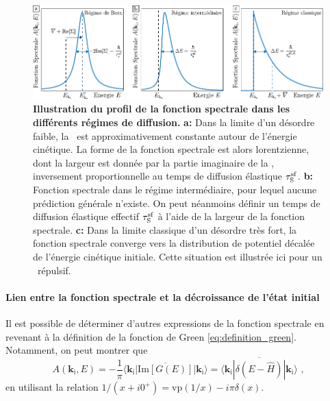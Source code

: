 \begin{figure}
\centering
\includegraphics[width=\textwidth]{Fig/TauS_NJP/illustration_fonction_spectrale_diffusion.pdf}
\caption{\textbf{Illustration du profil de la fonction spectrale dans les différents régimes de diffusion.} \textbf{a:} Dans la limite d'un désordre faible, la \selfenergy\ est approximativement constante autour de l'énergie cinétique. La forme de la fonction spectrale est alors lorentzienne, dont la largeur est donnée par la partie imaginaire de la \selfenergy , inversement proportionnelle au temps de diffusion élastique $\tau_{\mathrm{S}}^{\mathrm{sf}}$. \textbf{b:} Fonction spectrale dans le régime intermédiaire, pour lequel aucune prédiction générale n'existe. On peut néanmoins définir un temps de diffusion élastique effectif $\tau_{\mathrm{S}}^{\mathrm{sf}}$ à l'aide de la largeur de la fonction spectrale. \textbf{c:} Dans la limite classique d'un désordre très fort, la fonction spectrale converge vers la distribution de potentiel décalée de l'énergie cinétique initiale. Cette situation est illustrée ici pour un \speckle\ répulsif.}
\label{fig:illustration_fonction_spectrale_diffusion}
\end{figure}


\paragraph*{Lien entre la fonction spectrale et la décroissance de l'état initial}
Il est possible de déterminer d'autres expressions de la fonction spectrale en revenant à la définition de la fonction de Green \ref{eq:definition_green}. Notamment, on peut montrer que
\begin{equation}
A(\mathbf{k}_{\mathrm{i}},E)=-\frac{1}{\pi} \overline{\langle \mathbf{k}_{\mathrm{i}} | \mathrm{Im}\left[G(E)\right]| \mathbf{k}_{\mathrm{i}} \rangle} = \overline{\langle \mathbf{k}_{\mathrm{i}} | \delta(E-\hat{H})|\mathbf{k}_{\mathrm{i}}\rangle} \text{ ,}
\end{equation}
en utilisant la relation $ 1/(x+i0^+)=\mathrm{vp}(1/x)-i\pi \delta(x)$. 

